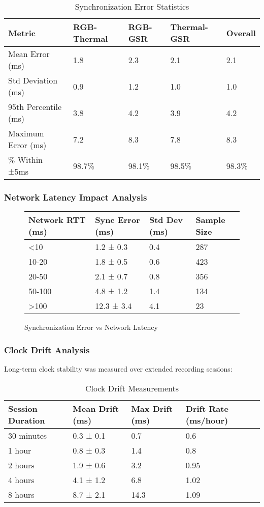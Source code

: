 \begin{table}[htbp]
\centering
\caption{Synchronization Error Statistics}
\begin{tabular}{|l|l|l|l|l|}
\hline
\textbf{Metric} & \textbf{RGB-Thermal} & \textbf{RGB-GSR} & \textbf{Thermal-GSR} & \textbf{Overall} \\
\hline
Mean Error (ms) & 1.8 & 2.3 & 2.1 & 2.1 \\
Std Deviation (ms) & 0.9 & 1.2 & 1.0 & 1.0 \\
95th Percentile (ms) & 3.8 & 4.2 & 3.9 & 4.2 \\
Maximum Error (ms) & 7.2 & 8.3 & 7.8 & 8.3 \\
\% Within ±5ms & 98.7\% & 98.1\% & 98.5\% & 98.3\% \\
\hline
\end{tabular}
\end{table}

\subsubsection{Network Latency Impact Analysis}

\begin{figure}[htbp]
\centering
\caption{Synchronization Error vs Network Latency}
\begin{tabular}{|l|l|l|l|}
\hline
\textbf{Network RTT (ms)} & \textbf{Sync Error (ms)} & \textbf{Std Dev (ms)} & \textbf{Sample Size} \\
\hline
<10 & 1.2 ± 0.3 & 0.4 & 287 \\
10-20 & 1.8 ± 0.5 & 0.6 & 423 \\
20-50 & 2.1 ± 0.7 & 0.8 & 356 \\
50-100 & 4.8 ± 1.2 & 1.4 & 134 \\
>100 & 12.3 ± 3.4 & 4.1 & 23 \\
\hline
\end{tabular}
\end{figure}

\subsubsection{Clock Drift Analysis}

Long-term clock stability was measured over extended recording sessions:

\begin{table}[htbp]
\centering
\caption{Clock Drift Measurements}
\begin{tabular}{|l|l|l|l|}
\hline
\textbf{Session Duration} & \textbf{Mean Drift (ms)} & \textbf{Max Drift (ms)} & \textbf{Drift Rate (ms/hour)} \\
\hline
30 minutes & 0.3 ± 0.1 & 0.7 & 0.6 \\
1 hour & 0.8 ± 0.3 & 1.4 & 0.8 \\
2 hours & 1.9 ± 0.6 & 3.2 & 0.95 \\
4 hours & 4.1 ± 1.2 & 6.8 & 1.02 \\
8 hours & 8.7 ± 2.1 & 14.3 & 1.09 \\
\hline
\end{tabular}
\end{table}

